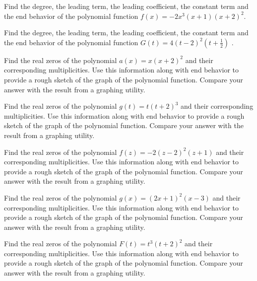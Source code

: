 \documentclass{ximera}
\begin{document}
\begin{problem}
Find the degree, the leading term, the leading coefficient, the constant term and the end behavior of the polynomial function $f(x) = -2x^3(x+1)(x+2)^2$.  
\end{problem}

\begin{problem}\label{polyfactslast}
Find the degree, the leading term, the leading coefficient, the constant term and the end behavior of the polynomial function $G(t) = 4(t-2)^2\left(t+\frac{1}{2}\right)$ . 
\end{problem}




\begin{problem}\label{zeromultgraphfirst}
Find the real zeros of the polynomial $a(x) = x(x + 2)^{2}$ and their corresponding multiplicities.  Use this information along with end behavior to provide a rough sketch of the graph of the polynomial function.  Compare your answer with the result from a graphing utility.
\end{problem}

\begin{problem}
Find the real zeros of the polynomial $g(t) = t(t + 2)^{3}$ and their corresponding multiplicities.  Use this information along with end behavior to provide a rough sketch of the graph of the polynomial function.  Compare your answer with the result from a graphing utility.
\end{problem}

\begin{problem}
Find the real zeros of the polynomial $f(z) = -2(z-2)^2(z+1)$ and their corresponding multiplicities.  Use this information along with end behavior to provide a rough sketch of the graph of the polynomial function.  Compare your answer with the result from a graphing utility.
\end{problem}

\begin{problem}
Find the real zeros of the polynomial $g(x) = (2x+1)^2(x-3)$ and their corresponding multiplicities.  Use this information along with end behavior to provide a rough sketch of the graph of the polynomial function.  Compare your answer with the result from a graphing utility.
\end{problem}


\begin{problem}
Find the real zeros of the polynomial $F(t) = t^{3}(t+ 2)^{2}$ and their corresponding multiplicities.  Use this information along with end behavior to provide a rough sketch of the graph of the polynomial function.  Compare your answer with the result from a graphing utility.
\end{problem}
\end{document}
